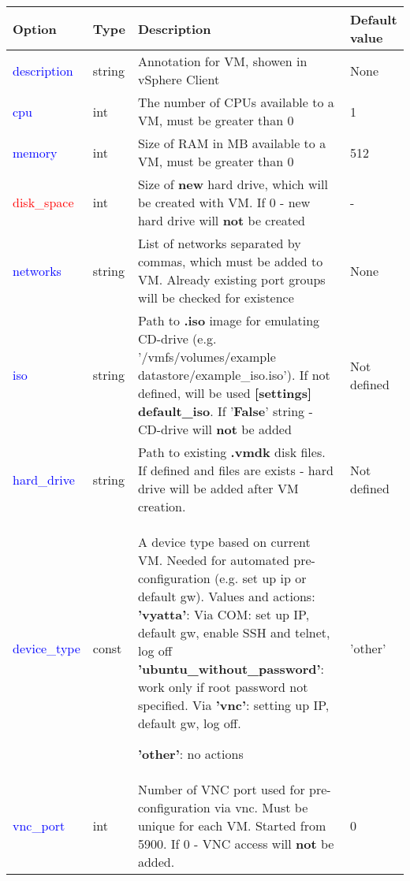 \documentclass[a4paper,11pt]{article}
\def \frst {2.8cm} %
\def \scnd {1.2cm} %
\def \thrd {8cm}
\def \frth {3cm}
\def \tnamefsrt{\textbf{Option}}
\def \tnamescnd{\textbf{Type}}
\def \tnamethrd{\textbf{Description}}
\def \tnamefrth{\textbf{Default value}}
\begin{document}
\begin{tabular}{p{\frst}|p{\scnd}|p{\thrd}|p{\frth}}
\tnamefsrt 		   		   & \tnamescnd   & \tnamethrd           & \tnamefrth 			\\
\hline
\textcolor{blue}{description} & string & Annotation for VM, showen in vSphere Client & None\\

\textcolor{blue}{cpu}        & int     & The number of CPUs available to a VM, must be greater than 0        & 1 \\
\textcolor{blue}{memory}     & int     & Size of RAM in MB available to a VM, must be greater than 0         & 512 \\
\textcolor{red}{disk\_space} & int     & Size of \textbf{new} hard drive, which will be created with VM. 
                                         If 0 - new hard drive will \textbf{not} be created                  & - \\
\textcolor{blue}{networks}   & string  & List of networks separated by commas, which must be added to VM. 
                                         Already existing port groups will be checked for existence          & None  \\
\textcolor{blue}{iso}        & string  & Path to \textbf{.iso} image for emulating CD-drive 
                                         (e.g. '/vmfs/volumes/example datastore/example\_iso.iso'). 
                                         If not defined, will be used \textbf{[settings] default\_iso}. 
                                         If '\textbf{False}' string - CD-drive will \textbf{not} be added    & Not defined \\
\textcolor{blue}{hard\_drive} & string & Path to existing \textbf{.vmdk } disk files. If defined and files are exists - hard drive will be added after VM creation. & Not defined \\
\textcolor{blue}{device\_type} & const & A device type based on current VM. Needed for automated pre-configuration (e.g. set up ip or default gw). Values and actions: \textbf{'vyatta'}: Via COM: set up IP, default gw, enable SSH and telnet, log off \textbf{'ubuntu\_without\_password'}: work only if root password not specified. Via \textbf{'vnc'}: setting up IP, default gw, log off. \par \textbf{'other'}: no actions & 'other' \\ 
\textcolor{blue}{vnc\_port} & int & Number of VNC port used for pre-configuration via vnc. Must be unique for each VM. Started from 5900. If 0 - VNC access will \textbf{not} be added. & 0 \\

\end{tabular}
\end{document}
